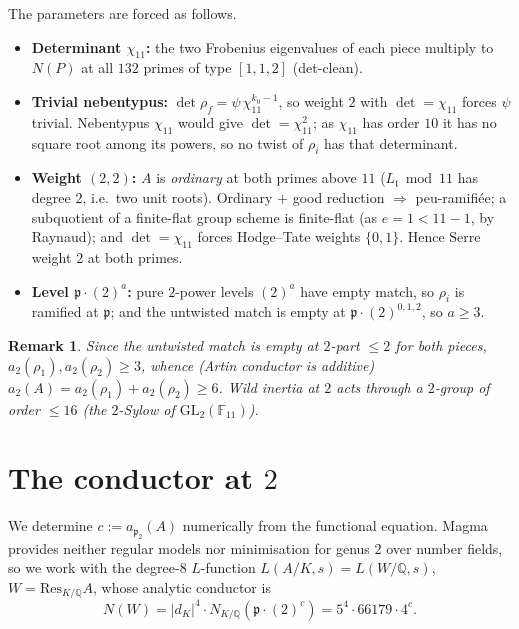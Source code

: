 \documentclass[11pt]{article}
\newtheorem{remark}{Remark}
\newcommand{\bbF}{\mathbb{F}}
\newcommand{\bbQ}{\mathbb{Q}}
\newcommand{\chicyc}{\chi_{11}}
\begin{document}
The parameters are forced as follows.
\begin{itemize}
\item\textbf{Determinant $\chicyc$:} the two Frobenius eigenvalues of each piece multiply to
$N(P)$ at all $132$ primes of type $[1,1,2]$ (det-clean).
\item\textbf{Trivial nebentypus:} $\det\rho_f=\psi\,\chicyc^{k_0-1}$, so weight $2$ with
$\det=\chicyc$ forces $\psi$ trivial. Nebentypus $\chicyc$ would give $\det=\chicyc^{2}$; as
$\chicyc$ has order $10$ it has no square root among its powers, so no twist of $\rho_i$ has that
determinant.
\item\textbf{Weight $(2,2)$:} $A$ is \emph{ordinary} at both primes above $11$ ($L_{\mathfrak
l}\bmod 11$ has degree $2$, i.e.\ two unit roots). Ordinary $+$ good reduction $\Rightarrow$
peu-ramifi\'ee; a subquotient of a finite-flat group scheme is finite-flat (as $e=1<11-1$, by
Raynaud); and $\det=\chicyc$ forces Hodge--Tate weights $\{0,1\}$. Hence Serre weight $2$ at both
primes.
\item\textbf{Level $\mathfrak p\cdot(2)^{a}$:} pure $2$-power levels $(2)^{a}$ have empty match,
so $\rho_i$ is ramified at $\mathfrak p$; and the untwisted match is empty at $\mathfrak
p\cdot(2)^{0,1,2}$, so $a\ge 3$.
\end{itemize}

\begin{remark}
Since the untwisted match is empty at $2$-part $\le 2$ for both pieces, $a_2(\rho_1),a_2(\rho_2)
\ge 3$, whence (Artin conductor is additive) $a_2(A)=a_2(\rho_1)+a_2(\rho_2)\ge 6$. Wild inertia
at $2$ acts through a $2$-group of order $\le 16$ (the $2$-Sylow of $\mathrm{GL}_2(\bbF_{11})$).
\end{remark}

\section{The conductor at $2$}\label{sec:cond2}

We determine $c:=a_{\mathfrak p_2}(A)$ numerically from the functional equation. Magma provides
neither regular models nor minimisation for genus $2$ over number fields, so we work with the
degree-$8$ $L$-function $L(A/K,s)=L(W/\bbQ,s)$, $W=\mathrm{Res}_{K/\bbQ}A$, whose analytic
conductor is
\[
N(W)=|d_K|^{4}\cdot N_{K/\bbQ}(\mathfrak p\cdot(2)^{c})=5^{4}\cdot 66179\cdot 4^{c}.
\]
\end{document}
